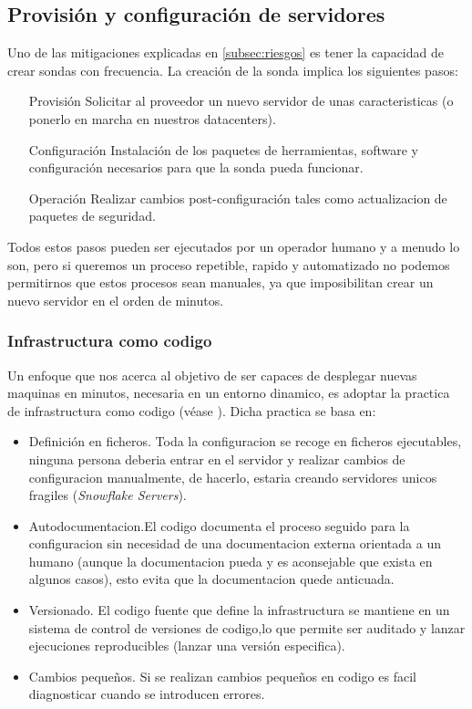 \subsection{Provisión y configuración de servidores}
\label{subsec:server-config}

Uno de las mitigaciones explicadas en \ref{subsec:riesgos} es tener la capacidad de crear sondas con frecuencia. La creación de la sonda implica
los siguientes pasos:

\begin{enumerate}
    \item[Provisión] Solicitar al proveedor un nuevo servidor de unas caracteristicas (o ponerlo en marcha en nuestros datacenters).
    \item[Configuración] Instalación de los paquetes de herramientas, software y configuración necesarios para que la sonda pueda funcionar.
    \item[Operación] Realizar cambios post-configuración tales como actualizacion de paquetes de seguridad.
\end{enumerate}

Todos estos pasos pueden ser ejecutados por un operador humano y a menudo lo son, pero si queremos un proceso repetible, rapido y automatizado
no podemos permitirnos que estos procesos sean manuales, ya que imposibilitan crear un nuevo servidor en el orden de minutos.

\subsubsection{Infrastructura como codigo}
\label{subsec:infra-as-code}

Un enfoque que nos acerca al objetivo de ser capaces de desplegar nuevas maquinas en minutos, necesaria en un entorno dinamico, es adoptar la practica
de infrastructura como codigo (véase \cite{fowler-infra-as-code}). Dicha practica se basa en:

\begin{itemize}
    \item Definición en ficheros. Toda la configuracion se recoge en ficheros ejecutables, ninguna persona deberia entrar en el servidor
    y realizar cambios de configuracion manualmente, de hacerlo, estaria creando servidores unicos fragiles (\emph{Snowflake Servers}).
    \item Autodocumentacion.El codigo documenta el proceso seguido para la configuracion sin necesidad de una documentacion externa orientada a un humano (aunque la documentacion pueda y es aconsejable que exista en algunos casos), esto evita que la documentacion quede anticuada.
    \item Versionado. El codigo fuente que define la infrastructura se mantiene en un sistema de control de versiones de codigo,lo que permite ser auditado y lanzar ejecuciones reproducibles (lanzar una versión especifica).
    \item Cambios pequeños. Si se realizan cambios pequeños en codigo es facil diagnosticar cuando se introducen errores.
\end{itemize}
 

